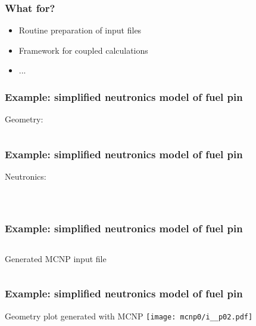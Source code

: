 \documentclass[t]{beamer}
\begin{document}
\begin{frame}\frametitle{What for?}    

    
    \begin{itemize}
    \item Routine preparation of input files 

    \item Framework for coupled calculations

    \item ...
    \end{itemize}

\end{frame}

\newcommand{\exModel}{Example: simplified neutronics model of fuel pin}
\begin{frame}[fragile]
    \frametitle{\exModel}

    Geometry:
    \inputminted[frame=single,fontfamily=tt,fontsize=\footnotesize]{python}{geom.py}

\end{frame}

\begin{frame}[fragile]
    \frametitle{\exModel}

    Neutronics:

    \begin{columns}
            \inputminted[frame=single,fontfamily=tt,fontsize=\footnotesize,firstline=3,lastline=17]{python}{mc_int.py}
            \inputminted[frame=single,fontfamily=tt,fontsize=\footnotesize,firstline=17]{python}{mc_int.py}
    \end{columns}

\end{frame}

\begin{frame}
    \frametitle{\exModel}
    \begin{columns}
            {\tiny Generated MCNP input file}
            \inputminted[frame=single,fontfamily=tt,fontsize=\tiny,firstline=3,lastline=33]{rst}{mcnp0/i_}
            \inputminted[frame=single,fontfamily=tt,fontsize=\tiny,firstline=34]{rst}{mcnp0/i_}
    \end{columns}
\end{frame}

\begin{frame}[fragile]
    \frametitle{\exModel}

    {\small Geometry plot generated with MCNP}
    \texttt{[image: mcnp0/i\_\_p02.pdf]}
\end{frame}
\end{document}
